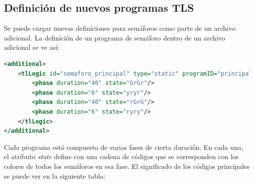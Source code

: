\hypertarget{definiciuxf3n-de-nuevos-programas-tls}{%
\subsection{Definición de nuevos programas
TLS}\label{definiciuxf3n-de-nuevos-programas-tls}}

Se puede cargar nuevas definiciones para semáforos como parte de un
archivo adicional. La definición de un programa de semáforo dentro de un
archivo adicional se ve así:

\begin{lstlisting}[language=XML]
<additional>
    <tlLogic id="semaforo_principal" type="static" programID="principal" offset="0">
        <phase duration="40" state="GrGr"/>
        <phase duration="6" state="yryr"/>
        <phase duration="40" state="rGrG"/>
        <phase duration="6" state="ryry"/>
    </tlLogic>
</additional>
\end{lstlisting}

Cada programa está compuesto de varias fases de cierta duración. En cada
una, el atributo \emph{state} define con una cadena de códigos que se
corresponden con los colores de todos los semáforos en esa fase. El
significado de los códigos principales se puede ver en la siguiente
tabla:


